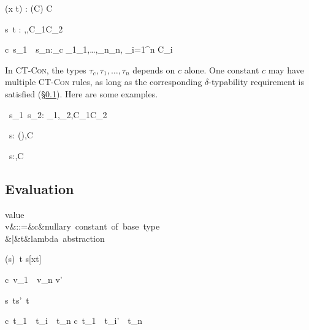 \documentclass{amsart}
\theoremstyle{definition}
\begin{document}
{\Gamma\vdash (\Abs x t) :
(\sigma\R\tau\Given C) \Given C}

{\Gamma\vdash s~t : \beta \Given
\sigma\Sub\alpha\R\beta,\tau\Sub\alpha,C_1\cup C_2}

{\Gamma\vdash c~s_1~\cdots~s_n:\tau_c\Given
\sigma_1\Sub\tau_1,\ldots,\sigma_n\Sub\tau_n,
{\textstyle\bigcup_{i=1}^n C_i}
}

In \textsc{CT-Con}, the types $\tau_c,\tau_1,\ldots,\tau_n$
depends on $c$ alone. One constant $c$ may have multiple
\textsc{CT-Con} rules, as long as the corresponding
$\delta$-typability requirement is satisfied
(\S\ref{eval}). Here are some examples.

{\Gamma\vdash\Add~s_1~s_2:
\Int\Given\sigma_1\Sub\Int,\sigma_2\Sub\Int,C_1\cup C_2}

{\Gamma\vdash\If~s:
(\All\alpha\alpha\R\alpha\R\alpha)\Given\sigma\Sub\Bool,C}

{\Gamma\vdash\Fix~s:\alpha\Given\sigma\Sub \alpha\R\alpha,C}

\subsection{Evaluation}
\label{eval}

\begin{syntax}
\mbox{value}\\
v&::=&c&\mbox{nullary constant of base type}\\
&|&t&\mbox{lambda abstraction}
\end{syntax}

\infrule[$\beta$]
{}
{(s)~t \Red s[x\mapsto t]}

\infrule[$\delta$]
{}
{c~v_1~\cdots~v_n \Red v'}

{s~t\Red s'~t}

{c~t_1~\cdots~t_i~\cdots~t_n
\Red
c~t_1~\cdots~t_i'~\cdots~t_n
}
\end{document}
